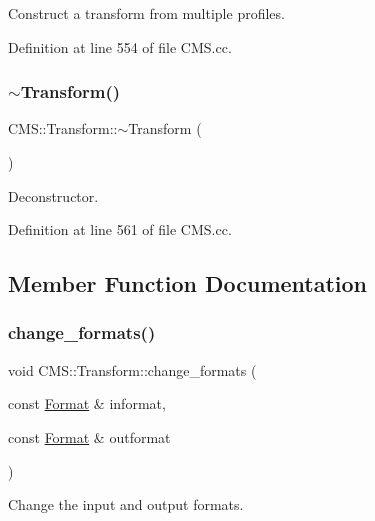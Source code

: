 Construct a transform from multiple profiles. 



Definition at line 554 of file C\+M\+S.\+cc.

\mbox{\label{class_c_m_s_1_1_transform_ac76565923f8999c82fa8f1f65ad2e43d}} 
\subsubsection{\texorpdfstring{$\sim$\+Transform()}{~Transform()}}
{\footnotesize\ttfamily C\+M\+S\+::\+Transform\+::$\sim$\+Transform (\begin{DoxyParamCaption}{ }\end{DoxyParamCaption})}



Deconstructor. 



Definition at line 561 of file C\+M\+S.\+cc.



\subsection{Member Function Documentation}
\mbox{\label{class_c_m_s_1_1_transform_a1bb15efea35b385a09e84e5a38f87a3f}} 
\subsubsection{\texorpdfstring{change\+\_\+formats()}{change\_formats()}}
{\footnotesize\ttfamily void C\+M\+S\+::\+Transform\+::change\+\_\+formats (\begin{DoxyParamCaption}\item[{const \hyperlink{class_c_m_s_1_1_format}{Format} \&}]{informat,  }\item[{const \hyperlink{class_c_m_s_1_1_format}{Format} \&}]{outformat }\end{DoxyParamCaption})}



Change the input and output formats. 



